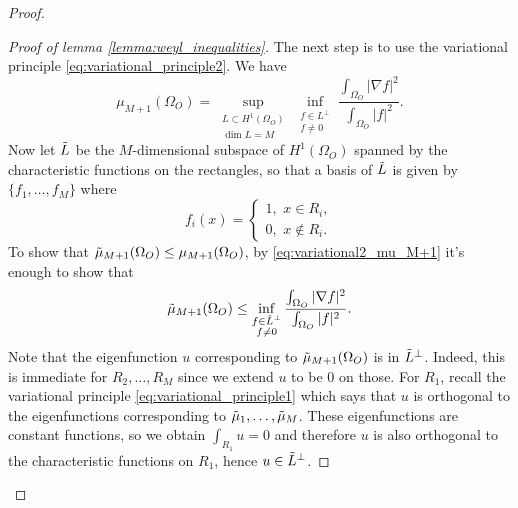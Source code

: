 \documentclass{amsart}
\theoremstyle{definition}
\begin{document}
\begin{proof}
\begin{proof}[Proof of lemma \ref{lemma:weyl_inequalities}]
    The next step is to use the variational principle \eqref{eq:variational_principle2}. We have
    \begin{equation} \label{eq:variational2_mu_M+1}
        \mu_{M+1}(\Omega_O) = \sup_{\substack{L \subset H^1(\Omega_O) \\ \text{ dim } L = M}} \inf_{\substack{f \in L^{\perp} \\ f \neq 0}} \frac{\int_{\Omega_O} |\nabla f|^2}{\int_{\Omega_O} |f|^2}.
    \end{equation}
    Now let $\Tilde{L}$ be the $M$-dimensional subspace of $H^1(\Omega_O)$ spanned by the characteristic functions on the rectangles, so that a basis of $\Tilde{L}$ is given by $\{f_1,\dots,f_M\}$ where 
    \begin{equation*}
        f_i(x) = 
        \begin{cases}
            1, \,\,x \in R_i, \\
            0, \,\,x \notin R_i. 
        \end{cases}
    \end{equation*}
    To show that $\Tilde{\mu}_{M+1}(\Omega_O) \leq \mu_{M+1}(\Omega_O)$, by \eqref{eq:variational2_mu_M+1} it's enough to show that
    \begin{equation*}
        \Tilde{\mu}_{M+1}(\Omega_O) \leq \inf_{\substack{f \in \Tilde{L}^{\perp} \\ f \neq 0}} \frac{\int_{\Omega_O} |\nabla f|^2}{\int_{\Omega_O} |f|^2}. 
    \end{equation*}
    Note that the eigenfunction $u$ corresponding to $\Tilde{\mu}_{M+1}(\Omega_O)$ is in $\Tilde{L}^{\perp}$. Indeed, this is immediate for $R_2,\dots,R_M$ since we extend $u$ to be 0 on those. For $R_1$, recall the variational principle \eqref{eq:variational_principle1} which says that $u$ is orthogonal to the eigenfunctions corresponding to $\Tilde{\mu}_1,\dots,\Tilde{\mu}_M$. These eigenfunctions are constant functions, so we obtain $\int_{R_1} u = 0$ and therefore $u$ is also orthogonal to the characteristic functions on $R_1$, hence $u \in \Tilde{L}^\perp$. 


\end{proof}
\end{proof}
\end{document}
